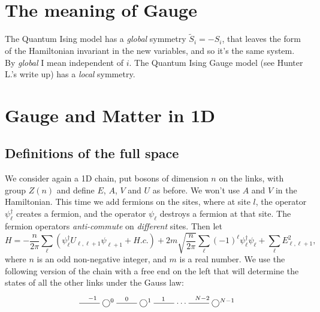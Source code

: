 
%
	
	\section{The meaning of Gauge}
	The Quantum Ising model has a \emph{global} symmetry $\tilde{S}_i = -S_i$, that leaves
	the form of the Hamiltonian invariant in the new variables, and so it's the same system.
	By \emph{global} I mean independent of $i$.
	The Quantum Ising Gauge model (see Hunter L.'s write up) has a \emph{local} symmetry.
	
	\section{Gauge and Matter in 1D}
	\subsection{Definitions of the full space}
	We consider again a 1D chain, put bosons of dimension $n$ on the links, with group $Z(n)$ and
	define $E$, $A$, $V$ and $U$ as before. We won't use $A$ and $V$ in the Hamiltonian.
	This time we add fermions on the sites, where at site $l$, the operator $\psi_\ell^\dagger$
	creates a fermion, and the operator $\psi_\ell$ destroys a fermion at that site.
	The fermion operators \emph{anti-commute} on \emph{different} sites.
	Then let
		\begin{equation}\label{eq:1dQEDLatticeHamiltonian}
	H=-\frac{n}{2\pi} \sum_\ell (\psi_\ell^\dagger U_{\ell,\ell+1}\psi_{\ell+1}+H.c.) + 2m\sqrt{\frac{n}{2\pi}}\sum_\ell (-1)^\ell \psi_\ell^\dagger\psi_\ell+  \sum_{\ell} E_{\ell,\ell+1}^2,		
	\end{equation}
	where $n$ is an odd non-negative integer, and $m$ is a real number. We use the following version of the chain with a free end on the left that will determine the states of all the other links under the Gauss law:
	\begin{equation}\label{eq:lchain}
	\xymatrix{
	\ar@{-}[r]^{-1} & \bigcirc^0 \ar@{-}[r]^{0} &  \bigcirc^1 \ar@{-}[r]^{1} & \cdots & \ar@{-}[l]_{N-2} \bigcirc^{N-1}
	}
	\end{equation}
	
